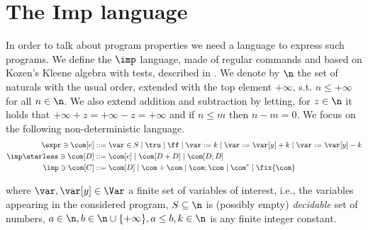 \section{The Imp language}

In order to talk about program properties we need a language to
express such programs. We define the \(\imp\) language, made of
regular commands and based on Kozen’s Kleene algebra with tests,
described in \cite{kozen1997kleene}.  We denote by \(\n\) the set of
naturals with the usual order, extended with the top element
\(+\infty\), s.t.  \(n \leq +\infty\) for all \(n \in \n\). We also
extend addition and subtraction by letting, for \(z \in \n\) it holds
that \(+\infty + z = + \infty - z = + \infty\) and if \(n \leq m\)
then \(n - m = 0\).  We focus on the following non-deterministic
language.
\begin{align*}
  \expr \ni \com[e] ::= & \; \var \in S \mid \tru \mid \ff \mid \var := k \mid \var := \var[y] + k \mid \var := \var[y] - k \\
  \imp\starless \ni \com[D] ::= & \; \com[e] \mid \com[D + D] \mid \com[D ; D] \\
  \imp \ni \com[C] ::= & \; \com[D] \mid \com + \com \mid \com ; \com \mid \com^* \mid \fix{\com}
\end{align*}

where \(\var, \var[y] \in \Var\) a finite set of variables of
interest, i.e., the variables appearing in the considered program,
\(S\subseteq \n\) is (possibly empty) \emph{decidable} set of numbers,
\(a \in \n, b\in\n\cup\{+\infty\}, a\leq b, k \in \n\)
is any finite integer constant.
